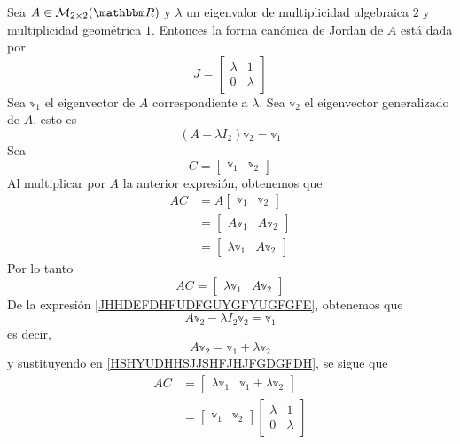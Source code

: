 \begin{theorem}
    Sea $A \in \mathcal{M}_{2 \times 2}(\RR)$ y $\lambda$ un eigenvalor de multiplicidad algebraica $2$ y multiplicidad geométrica $1$. Entonces la forma canónica de Jordan de $A$ está dada por
    $$J = \begin{bmatrix}
        \lambda & 1 \\
        0 & \lambda
    \end{bmatrix}$$
    \demostracion Sea $\mathbb{v}_1$ el eigenvector de $A$ correspondiente a $\lambda$. Sea $\mathbb{v}_2$ el eigenvector generalizado de $A$, esto es
    \begin{equation}
        (A - \lambda I_2)\mathbb{v}_2 = \mathbb{v}_1 \label{JHHDEFDHFUDFGUYGFYUGFGFE}
    \end{equation}
    Sea
    $$C = \begin{bmatrix} \mathbb{v}_1 & \mathbb{v}_2 \end{bmatrix}$$
    Al multiplicar por $A$ la anterior expresión, obtenemos que
    \begin{align*}
        AC & = A \begin{bmatrix} \mathbb{v}_1 & \mathbb{v}_2 \end{bmatrix} \\
        & = \begin{bmatrix} A\mathbb{v}_1 & A\mathbb{v}_2 \end{bmatrix} \\
        & = \begin{bmatrix} \lambda \mathbb{v}_1 & A\mathbb{v}_2 \end{bmatrix}
    \end{align*}
    Por lo tanto
    \begin{equation}
        AC = \begin{bmatrix} \lambda \mathbb{v}_1 & A\mathbb{v}_2 \end{bmatrix} \label{HSHYUDHHSJJSHFJHJFGDGFDH}
    \end{equation}
    De la expresión \eqref{JHHDEFDHFUDFGUYGFYUGFGFE}, obtenemos que
    $$A\mathbb{v}_2 - \lambda I_2\mathbb{v}_2 = \mathbb{v}_1$$
    es decir,
    $$A\mathbb{v}_2 = \mathbb{v}_1 + \lambda \mathbb{v}_2$$
    y sustituyendo en \eqref{HSHYUDHHSJJSHFJHJFGDGFDH}, se sigue que
    \begin{align*}
        AC & = \begin{bmatrix} \lambda \mathbb{v}_1 & \mathbb{v}_1 + \lambda \mathbb{v}_2 \end{bmatrix} \\
        & = \begin{bmatrix} \mathbb{v}_1 & \mathbb{v}_2 \end{bmatrix} \begin{bmatrix} \lambda & 1 \\ 0 & \lambda \end{bmatrix} \\

\end{align*}
\end{theorem}
